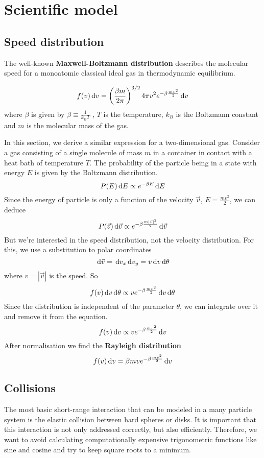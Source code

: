 \section{Scientific model}
\subsection{Speed distribution}

The well-known \textbf{Maxwell-Boltzmann distribution} describes the molecular 
speed for a monoatomic classical ideal gas in thermodynamic equilibrium.

$$
f(v)\,\mathrm d v = \left( \frac{\beta m}{2 \pi} \right)^{3/2} 4 \pi v^2 e^{-\beta 
\frac{mv^2}{2}} \,\mathrm d v
$$
where $\beta$ is given by
\begin{math}
\beta \equiv \frac{1}{k_BT}
\end{math}
, $T$ is the temperature, $k_B$ is the Boltzmann constant and $m$ is the 
molecular mass of the gas.

In this section, we derive a similar expression for a two-dimensional gas.
Consider a gas consisting of a single molecule of mass $m$ in a container in 
contact with a heat bath of temperature $T$. The probability of the particle 
being in a state with energy $E$ is given by the Boltzmann distribution.
$$
P(E) \,\mathrm d E \propto e^{-\beta E}\,\mathrm d E
$$
Since the energy of particle is only a function of the velocity $\vec{v}$, $E = 
\frac{mv^2}{2}$, we can deduce
$$
P(\vec v)\,\mathrm d{\vec v} \propto e^{- \beta \frac{m |\vec v|^2}{2}}\,\mathrm d\vec v
$$
But we're interested in the speed distribution, not the velocity distribution.  
For this, we use a substitution to polar coordinates
$$
\,\mathrm d \vec{v} = \,\mathrm d v_x\,\mathrm d v_y = v\,\mathrm d v\,\mathrm d \theta
$$
where $v=|\vec{v}|$ is the speed. So
$$
f(v)\,\mathrm d v\,\mathrm d \theta \propto ve^{- \beta \frac{mv^2}{2}} \,\mathrm d v\,\mathrm d \theta
$$
Since the distribution is independent of the parameter $\theta$, we can 
integrate over it and remove it from the equation.
$$
f(v)\,\mathrm d v\propto ve^{- \beta \frac{mv^2}{2}} \,\mathrm d v
$$
After normalisation we find the \textbf{Rayleigh distribution}
$$
f(v)\,\mathrm d v=\beta m ve^{-\beta \frac{mv^2}{2}} \,\mathrm d v
$$

\subsection{Collisions}

The most basic short-range interaction that can be modeled in a many particle 
system is the elastic collision between hard spheres or disks. It is important 
that this interaction is not only addressed correctly, but also efficiently.  
Therefore, we want to avoid calculating computationally expensive trigonometric 
functions like sine and cosine and try to keep square roots to a minimum.

